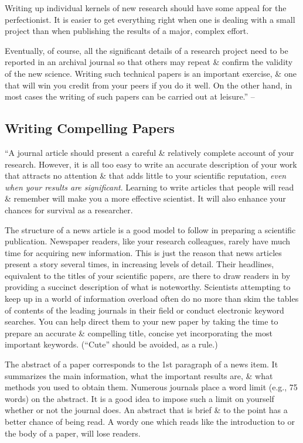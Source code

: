 \documentclass{article}
\numberwithin{equation}{section}
\begin{document}
Writing up individual kernels of new research should have some appeal for the perfectionist. It is easier to get everything right when one is dealing with a small project than when publishing the results of a major, complex effort.

Eventually, of course, all the significant details of a research project need to be reported in an archival journal so that others may repeat \& confirm the validity of the new science. Writing such technical papers is an important exercise, \& one that will win you credit from your peers if you do it well. On the other hand, in most cases the writing of such papers can be carried out at leisure.'' -- \cite[pp. 54--58]{Feibelman2011}

\subsection{Writing Compelling Papers}
``A journal article should present a careful \& relatively complete account of your research. However, it is all too easy to write an accurate description of your work that attracts no attention \& that adds little to your scientific reputation, \textit{even when your results are significant}. Learning to write articles that people will read \& remember will make you a more effective scientist. It will also enhance your chances for survival as a researcher.

The structure of a news article is a good model to follow in preparing a scientific publication. Newspaper readers, like your research colleagues, rarely have much time for acquiring new information. This is just the reason that news articles present a story several times, in increasing levels of detail. Their headlines, equivalent to the titles of your scientific papers, are there to draw readers in by providing a succinct description of what is noteworthy. Scientists attempting to keep up in a world of information overload often do no more than skim the tables of contents of the leading journals in their field or conduct electronic keyword searches. You can help direct them to your new paper by taking the time to prepare an accurate \& compelling title, concise yet incorporating the most important keywords. (``Cute'' should be avoided, as a rule.)

The abstract of a paper corresponds to the 1st paragraph of a news item. It summarizes the main information, what the important results are, \& what methods you used to obtain them. Numerous journals place a word limit (e.g., 75 words) on the abstract. It is a good idea to impose such a limit on yourself whether or not the journal does. An abstract that is brief \& to the point has a better chance of being read. A wordy one which reads like the introduction to or the body of a paper, will lose readers.
\end{document}
